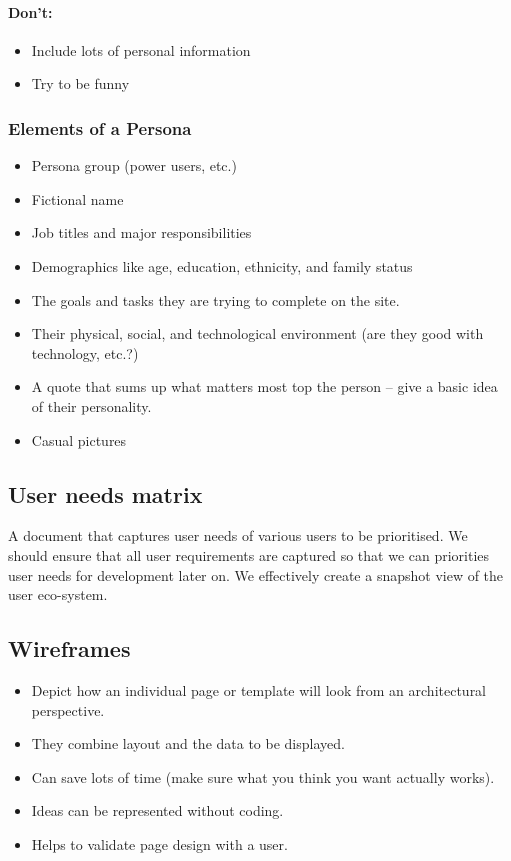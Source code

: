 \paragraph{Don't:}\label{par:don_t}

\begin{itemize}
    \item Include lots of personal information
    \item Try to be funny
\end{itemize}

\subsubsection{Elements of a Persona}\label{ssub:elements_of_a_persona}

\begin{itemize}
    \item Persona group (power users, etc.)
    \item Fictional name
    \item Job titles and major responsibilities
    \item Demographics like age, education, ethnicity, and family status
    \item The goals and tasks they are trying to complete on the site.
    \item Their physical, social, and technological environment (are they good with technology, etc.?)
    \item A quote that sums up what matters most top the person -- give a basic idea of their personality.
    \item Casual pictures
\end{itemize}

\subsection{User needs matrix}\label{sub:user_needs_matrix}

A document that captures user needs of various users to be prioritised.
We should ensure that all user requirements are captured so that we can priorities user needs for development later on.
We effectively create a snapshot view of the user eco-system.

\subsection{Wireframes}\label{sub:wireframes_was}

\begin{itemize}
    \item Depict how an individual page or template will look from an architectural perspective.
    \item They combine layout and the data to be displayed.
    \item Can save lots of time (make sure what you think you want actually works).
    \item Ideas can be represented without coding.
    \item Helps to validate page design with a user.
\end{itemize}

